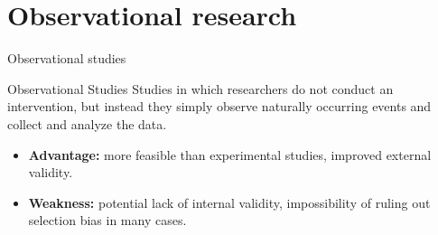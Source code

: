 \documentclass[aspectratio=169]{beamer}
\begin{document}
    


        
        
    

\section{\Large Observational research}

\begin{frame}{Observational studies}

    \begin{coolblock}{Observational Studies}
        Studies in which researchers do not conduct an intervention, but instead they simply observe naturally occurring events and collect and analyze the data.
    \end{coolblock}
    \vspace{0.3cm}

    \begin{itemize}
        \item \textbf{Advantage:} more feasible than experimental studies, improved external validity. 
        \item \textbf{Weakness:} potential lack of internal validity, impossibility of ruling out selection bias in many cases.
    \end{itemize}
    
\end{frame}
\end{document}
